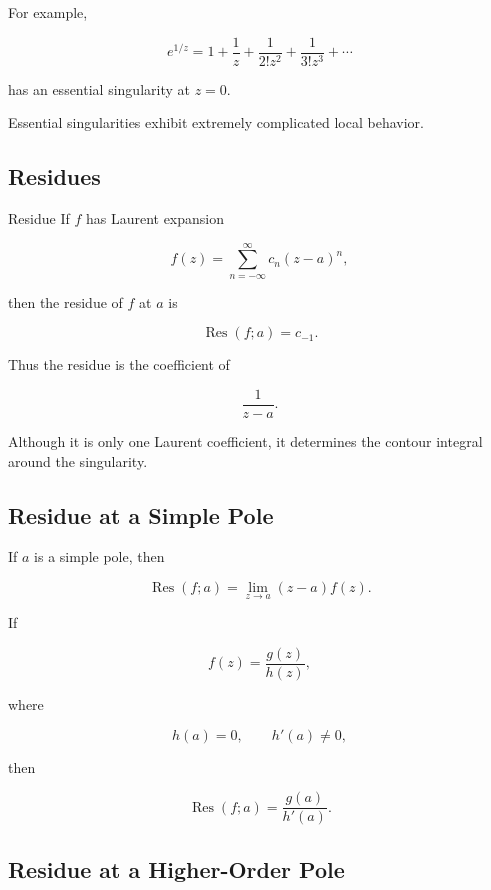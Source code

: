 For example,

\[
\boxed{
e^{1/z}
=
1+\frac1z+\frac1{2!z^2}
+\frac1{3!z^3}
+\cdots
}
\]

has an essential singularity at \(z=0\).

Essential singularities exhibit extremely complicated local behavior.

\subsection{Residues}
\label{subsec:residues}

\begin{definitionbox}{Residue}
If \(f\) has Laurent expansion

\[
f(z)
=
\sum_{n=-\infty}^{\infty}
c_n(z-a)^n,
\]

then the residue of \(f\) at \(a\) is

\[
\boxed{
\operatorname{Res}(f;a)
=
c_{-1}.
}
\]
\end{definitionbox}

Thus the residue is the coefficient of

\[
\frac1{z-a}.
\]

Although it is only one Laurent coefficient, it determines the contour
integral around the singularity.

\subsection{Residue at a Simple Pole}
\label{subsec:residue-simple-pole}

If \(a\) is a simple pole, then

\[
\boxed{
\operatorname{Res}(f;a)
=
\lim_{z\to a}
(z-a)f(z).
}
\]

If

\[
f(z)=\frac{g(z)}{h(z)},
\]

where

\[
h(a)=0,
\qquad
h'(a)\neq0,
\]

then

\[
\boxed{
\operatorname{Res}(f;a)
=
\frac{g(a)}{h'(a)}.
}
\]

\subsection{Residue at a Higher-Order Pole}
\label{subsec:residue-higher-order}

